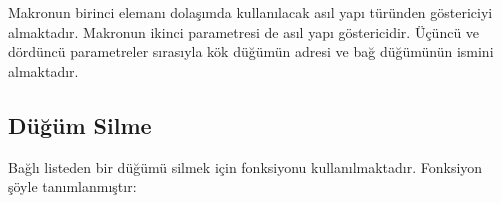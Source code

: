 \documentclass[a4paper,10pt,turkish]{sphinxmanual}
\begin{document}
\begin{sphinxVerbatim}[commandchars=\\\{\}]
\end{sphinxVerbatim}

\sphinxAtStartPar
Makronun birinci elemanı dolaşımda kullanılacak asıl yapı türünden göstericiyi almaktadır. Makronun
ikinci parametresi de asıl yapı göstericidir. Üçüncü ve dördüncü parametreler sırasıyla kök düğümün
adresi ve bağ düğümünün ismini almaktadır.


\subsection{Düğüm Silme}
\label{\detokenize{kernellinkedlistandhashtable:dugum-silme}}
\sphinxAtStartPar
Bağlı listeden bir düğümü silmek için  fonksiyonu kullanılmaktadır. Fonksiyon şöyle
tanımlanmıştır:
\end{document}
